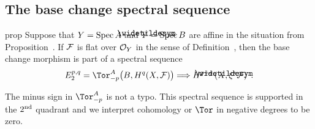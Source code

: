 \documentclass[a4paper,parskip=half,numbers=enddot, DIV=12]{scrreprt}
\begin{document}
\subsection{The base change spectral sequence}
\begin{varthm}{prop}
	Suppose that $Y=\operatorname{Spec} A$ and $\snake{Y}=\Spec B$ are affine in the situation from Proposition~. If $\mathcal{F}$ is flat over $\mathcal{O}_Y$ in the sense of Definition~, then the base change morphism  is part of a spectral sequence
	\begin{align*}
		E_2^{p,q}=\Tor_{-p}^A\big(B,H^q(X,\Ff)\big)\converge H^{p+q}\left(\snake{X},\xi^*\Ff\right)\;.
	\end{align*}
\end{varthm}
\begin{rem}
The minus sign in $\Tor_{-p}^A$ is not a typo. This spectral sequence is supported in the $2^{\text{nd}}$ quadrant and we interpret cohomology or $\Tor$ in negative degrees to be zero.
\end{rem}
\end{document}
